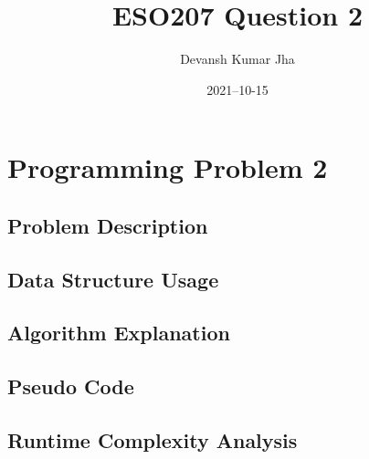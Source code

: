 \documentclass[20pt]{article}
\title{ESO207 Question 2}
\author{Devansh Kumar Jha}
\date{2021–10-15}
\begin{document}
\maketitle


\section{Programming Problem 2}

\subsection{Problem Description}

\subsection{Data Structure Usage}


\subsection{Algorithm Explanation}


\subsection{Pseudo Code}

\subsection{Runtime Complexity Analysis}
\end{document}
